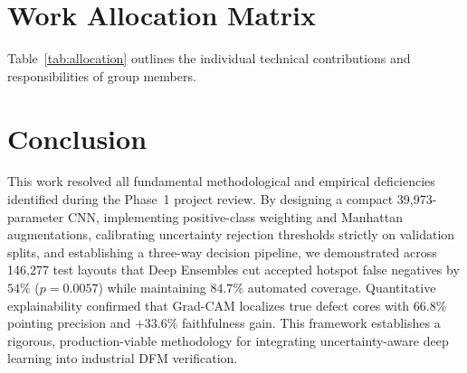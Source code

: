 \documentclass[conference]{IEEEtran}
\begin{document}
\section{Work Allocation Matrix}
Table~\ref{tab:allocation} outlines the individual technical contributions and responsibilities of group members.

\begin{table}[htbp]
\caption{Individual Work Allocation Matrix for Group G12.}
\label{tab:allocation}
\centering
{}
\end{table}

\section{Conclusion}
This work resolved all fundamental methodological and empirical deficiencies identified during the Phase~1 project review. By designing a compact 39,973-parameter CNN, implementing positive-class weighting and Manhattan augmentations, calibrating uncertainty rejection thresholds strictly on validation splits, and establishing a three-way decision pipeline, we demonstrated across 146,277 test layouts that Deep Ensembles cut accepted hotspot false negatives by $54\%$ ($p = 0.0057$) while maintaining $84.7\%$ automated coverage. Quantitative explainability confirmed that Grad-CAM localizes true defect cores with $66.8\%$ pointing precision and $+33.6\%$ faithfulness gain. This framework establishes a rigorous, production-viable methodology for integrating uncertainty-aware deep learning into industrial DFM verification.
\end{document}
